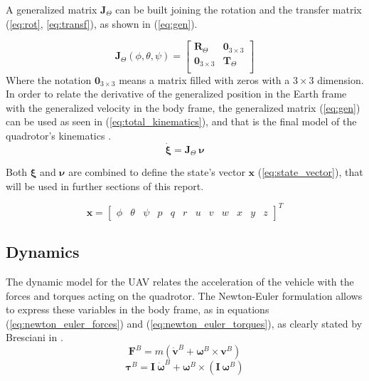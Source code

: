 \documentclass[journal, twoside]{IEEEtran}
\begin{document}
	A generalized matrix $\bm{J}_\Theta$ can be built joining the rotation and the transfer matrix (\ref{eq:rot}, \ref{eq:transf}), as shown in (\ref{eq:gen}).
	
	\begin{equation} \label{eq:gen}
	\bm{J}_\Theta (\phi,\theta, \psi)= \left[ {\begin{array}{cc}
		\bm{R}_\Theta &  \mathbf{0}_{3\times 3} \\
		\mathbf{0}_{3\times 3} & \bm{T}_\Theta \\
		\end{array} } \right]
	\end{equation}  
	Where the notation $\mathbf{0}_{3\times 3}$ means a matrix filled with zeros with a $3 \times 3$ dimension.\\
	
	In order to relate the derivative of the generalized position in the Earth frame with the generalized velocity in the body frame, the generalized matrix (\ref{eq:gen}) can be used as seen in (\ref{eq:total_kinematics}), and that is the final model of the quadrotor's kinematics \cite{SabatinoFrancesco2015Qcmn, mod_control_bresciani}.
	\begin{equation} \label{eq:total_kinematics}
	\bm{\dot\xi} = \bm{J}_\Theta \ 	\bm{\nu} 
	\end{equation} 
	
	Both $\bm{\xi}$ and $\bm{\nu}$ are combined to define the state's vector $\bm{x}$ (\ref{eq:state_vector}), that will be used in further sections of this report.
	
	\begin{equation} \label{eq:state_vector}
		\bm{x} = \left[ \begin{array}{cccccccccccc}
			\phi & \theta & \psi & p & q & r & u & v & w & x & y & z
			\end{array}\right] ^T
		\end{equation}
	
	\subsection{Dynamics}
	The dynamic model for the UAV relates the acceleration of the vehicle with the forces and torques acting on the quadrotor. The Newton-Euler formulation allows to express these variables in the body frame, as in equations (\ref{eq:newton_euler_forces}) and (\ref{eq:newton_euler_torques}), as clearly stated by Bresciani in \cite{mod_control_bresciani}.
	\begin{equation} \label{eq:newton_euler_forces}
	\bm{F}^B = m ( \bm{\dot v}^B + \bm{\omega}^B \times \bm{v}^B)
	\end{equation}
	\begin{equation} \label{eq:newton_euler_torques}
	\bm{\tau}^B = \bm{I} \ \bm{\dot \omega}^B + \bm{\omega}^B \times (\bm{I} \ \bm{\omega}^B)
	\end{equation}
	
\end{document}
